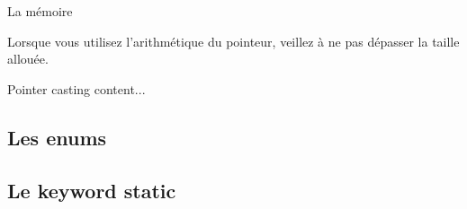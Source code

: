 \documentclass{beamer}
\begin{document}
\begin{darkframes}
\begin{frame}{La mémoire}
  		\begin{alertblock}{Lorsque vous utilisez l'arithmétique du pointeur, veillez à ne pas dépasser la taille allouée.}
  		\end{alertblock}
  	\end{frame}
  	
  	\begin{frame}{Pointer casting}
  		content...
  	\end{frame}
  	
  	
  	\subsection{Les enums}
  	\subsection{Le keyword static}
  	
  	
  \end{darkframes}
\end{document}
